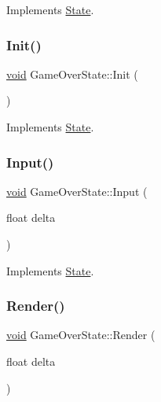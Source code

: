 Implements \hyperlink{classState_ade502eaa386d570e526eb356ffd73fd8}{State}.

\mbox{\label{classGameOverState_aa3d4f165ff735552f16132e929d369c2}} 
\subsubsection{\texorpdfstring{Init()}{Init()}}
{\footnotesize\ttfamily \hyperlink{imgui__impl__opengl3__loader_8h_ac668e7cffd9e2e9cfee428b9b2f34fa7}{void} Game\+Over\+State\+::\+Init (\begin{DoxyParamCaption}{ }\end{DoxyParamCaption})\hspace{0.3cm}{\ttfamily [virtual]}}



Implements \hyperlink{classState_a7ab4d8c6aa239a17ed579d89a209b156}{State}.

\mbox{\label{classGameOverState_adb4be2a5c6292d020999c2da9588ebfc}} 
\subsubsection{\texorpdfstring{Input()}{Input()}}
{\footnotesize\ttfamily \hyperlink{imgui__impl__opengl3__loader_8h_ac668e7cffd9e2e9cfee428b9b2f34fa7}{void} Game\+Over\+State\+::\+Input (\begin{DoxyParamCaption}\item[{float}]{delta }\end{DoxyParamCaption})\hspace{0.3cm}{\ttfamily [virtual]}}



Implements \hyperlink{classState_a1705412877f37a5cc8fc712542756076}{State}.

\mbox{\label{classGameOverState_ac9c9ef71b0a12940ac5caa7763f23fdc}} 
\subsubsection{\texorpdfstring{Render()}{Render()}}
{\footnotesize\ttfamily \hyperlink{imgui__impl__opengl3__loader_8h_ac668e7cffd9e2e9cfee428b9b2f34fa7}{void} Game\+Over\+State\+::\+Render (\begin{DoxyParamCaption}\item[{float}]{delta }\end{DoxyParamCaption})\hspace{0.3cm}{\ttfamily [virtual]}}



